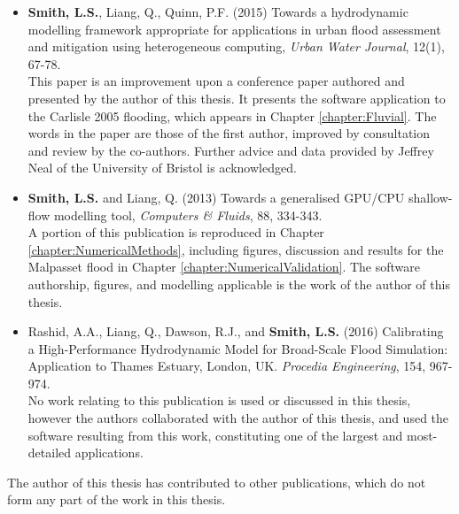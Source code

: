 \begin{publications}
\begin{itemize}
	\item\raggedright \textbf{Smith, L.S.}, Liang, Q., Quinn, P.F. (2015) Towards a hydrodynamic modelling framework appropriate for applications in urban flood assessment and mitigation using heterogeneous computing, \textit{Urban Water Journal}, 12(1), 67-78. \\[1ex]
	This paper is an improvement upon a conference paper authored and presented by the author of this thesis. It presents the software application to the Carlisle 2005 flooding, which appears in Chapter \ref{chapter:Fluvial}. The words in the paper are those of the first author, improved by consultation and review by the co-authors. Further advice and data provided by Jeffrey Neal of the University of Bristol is acknowledged.
	\\[2ex]
	
	\item\raggedright \textbf{Smith, L.S.} and Liang, Q. (2013) Towards a generalised GPU/CPU shallow-flow modelling tool, \textit{Computers \& Fluids}, 88, 334-343. \\[1ex]
	A portion of this publication is reproduced in Chapter \ref{chapter:NumericalMethods}, including figures, discussion and results for the Malpasset flood in Chapter \ref{chapter:NumericalValidation}. The software authorship, figures, and modelling applicable is the work of the author of this thesis.
	\\[2ex]
	
	\item\raggedright Rashid, A.A., Liang, Q., Dawson, R.J., and \textbf{Smith, L.S.} (2016) Calibrating a High-Performance Hydrodynamic Model for Broad-Scale Flood Simulation: Application to Thames Estuary, London, UK. \textit{Procedia Engineering}, 154, 967-974. \\[1ex]
	No work relating to this publication is used or discussed in this thesis, however the authors collaborated with the author of this thesis, and used the software resulting from this work, constituting one of the largest and most-detailed applications.
	\\[2ex]
\end{itemize}

The author of this thesis has contributed to other publications, which do not form any part of the work in this thesis.
\end{publications}